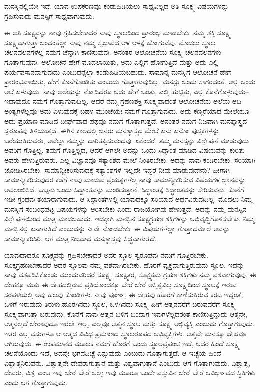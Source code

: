 ಮನಸ್ಸಿನಲ್ಲಿಯೇ ಇದೆ. ಯಾವ ಉಪಕರಣವೂ ಕಂಡುಹಿಡಿಯಲು ಸಾಧ್ಯವಿಲ್ಲದ ಅತಿ ಸೂಕ್ಷ್ಮ ವಿಷಯಗಳನ್ನು ಗ್ರಹಿಸುವುದು ಮನಸ್ಸಿಗೆ ಸಾಧ್ಯವಾಗುವುದು.

ಈ ಅತಿ ಸೂಕ್ಷ್ಮವನ್ನು ನಾವು ಗ್ರಹಿಸಬೇಕಾದರೆ ನಾವು ಸ್ಥೂಲದಿಂದ ಪ್ರಾರಂಭ ಮಾಡಬೇಕು. ನಮ್ಮ ಶಕ್ತಿ ಸೂಕ್ಷ್ಮ ಸೂಕ್ಷ್ಮವಾಗುತ್ತಾ ಬಂದಂತೆಲ್ಲಾ ನಾವು ನಮ್ಮ ಸ್ವಭಾವದ ಆಳ ಆಳಕ್ಕೆ ಹೋಗುವೆವು. ಮೊದಲು ಸ್ಥೂಲ ಚಲನವಲನಗಳೆಲ್ಲ ನಮಗೆ ಚೆನ್ನಾಗಿ ಕಾಣಿಸುವುವು. ಅನಂತರ ಆಲೋಚನೆಯ ಸೂಕ್ಷ್ಮ ಚಲನವಲನಗಳು ಗೊತ್ತಾಗುವುವು. ಆಲೋಚನೆ ಹೇಗೆ ಮೊದಲಾಯಿತು, ಅದು ಎಲ್ಲಿಗೆ ಹೋಗುತ್ತಿದೆ ಮತ್ತು ಅದು ಎಲ್ಲಿ ಪರ್ಯವಸಾನವಾಗುವುದು ಎಂಬುದನ್ನೆಲ್ಲಾ ಕಂಡುಹಿಡಿಯಬಹುದು. ಸಾಮಾನ್ಯ ಮನಸ್ಸಿಗೆ ಆಲೋಚನೆ ಹೇಗೆ ಪ್ರಾರಂಭವಾಯಿತು, ಹೇಗೆ ಕೊನೆಗೊಂಡಿತು ಎಂಬುದು ಗೊತ್ತಾಗುವುದಿಲ್ಲ. ಮನಸ್ಸು ಒಂದು ಸಾಗರದಂತೆ. ಅಲ್ಲಿ ಒಂದು ಅಲೆ ಏಳುವುದು. ನಾವು ಅಲೆಯನ್ನು ನೋಡಿದರೂ ಅದು ಹೇಗೆ ಬಂತು, ಎಲ್ಲಿ ಹುಟ್ಟಿತು, ಎಲ್ಲಿ ಕೊನೆಗೊಳ್ಳುವುದು–ಇದಾವುದೂ ನಮಗೆ ಗೊತ್ತಾಗುವುದಿಲ್ಲ. ಆದರೆ ನಮ್ಮ ಗ್ರಹಣಶಕ್ತಿ ಸೂಕ್ಷ್ಮವಾದಂತೆ ಆಲೋಚನೆಯ ಅಲೆಯ ಆದಿ ಅಂತ್ಯಗಳೆಲ್ಲವೂ ಅದು ಏಳುವುದಕ್ಕೆ ಬಹಳ ಮುಂಚೆಯೇ ನಮಗೆ ಗೊತ್ತಾಗುವುದು. ಅದು ಕಣ್ಮರೆಯಾದ ಮೇಲೆಯೂ ಅದು ಪ್ರಯಾಣ ಮಾಡಿದ ದೀರ್ಘವಾದ ಪಥವೂ ನಮಗೆ ಗೊತ್ತಾಗುತ್ತದೆ. ಅನಂತರ ನಮಗೆ ನಿಜವಾಗಿ ಮನಶ್ಶಾಸ್ತ್ರದ ಸ್ವರೂಪವು ತಿಳಿಯುತ್ತದೆ. ಈಗಿನ ಕಾಲದಲ್ಲಿ ಜನರು ಮನಶ್ಶಾಸ್ತ್ರದ ಮೇಲೆ ಏನು ಏನೋ ಪುಸ್ತಕಗಳನ್ನು ಬರೆಯುತ್ತಿರುವರು, ಅವೆಲ್ಲಾ ನಮ್ಮನ್ನು ದಾರಿತಪ್ಪಿಸುವಂಥವು. ಏಕೆಂದರೆ, ತಮ್ಮ ಮನಸ್ಸನ್ನು ವಿಶ್ಲೇಷಣೆ ಮಾಡುವುದು ಅವರಿಗೆ ಗೊತ್ತಿಲ್ಲ. ತಮಗೆ ಗೊತ್ತಿಲ್ಲದ, ಆದರೆ ಆಗಲೇ ಅದನ್ನು ಒಂದು ಸಿದ್ಧಾಂತ ಮಾಡಿದ ವಿಷಯವನ್ನು ಕುರಿತು ಅವರು ಹೇಳುತ್ತಿರುವರು. ಎಲ್ಲ ವಿಜ್ಞಾನವೂ ಸತ್ಯಾಂಶದ ಮೇಲೆ ನಿಂತಿರಬೇಕು. ಅದನ್ನು ನಾವು ಕಂಡಿರಬೇಕು; ಸರಿಯಾಗಿ ಜೋಡಿಸಿರಬೇಕು. ಸಾಮಾನ್ಯೀಕರಿಸುವುದಕ್ಕೆ ಸತ್ಯಾಂಶಗಳೆ ಇಲ್ಲದೇ ಇದ್ದರೆ ನೀವು ಮಾಡುವುದೇನು? ಹೀಗಾಗಿ ಸಾಮಾನ್ಯೀಕರಿಸುವುದರ ಕಡೆಗೆ ನಾವು ಮಾಡುವ ಪ್ರಯತ್ನಗಳೆಲ್ಲ ನಾವು ಸಾಮಾನ್ಯೀಕರಿಸುವ ವಿಷಯಗಳ ಜ್ಞಾನವನ್ನು ಅವಲಂಬಿಸಿದೆ. ಒಬ್ಬನು ಒಂದು ಸಿದ್ಧಾಂತವನ್ನು ಮಂಡಿಸುತ್ತಾನೆ. ಸಿದ್ಧಾಂತಕ್ಕೆ ಸಿದ್ಧಾಂತವನ್ನು ಸೇರಿಸುವನು. ಕೊನೆಗೆ ಇಡೀ ಗ್ರಂಥವು ತಯಾರಾಗುವುದು. ಆ ಸಿದ್ಧಾಂತಗಳಲ್ಲಿ ಯಾವುದಕ್ಕೂ ಸರಿಯಾದ ಅರ್ಥವಿರುವುದಿಲ್ಲ. ಮೊದಲು ನಿಮ್ಮ ಮನಸ್ಸಿಗೆ ಸಂಬಂಧಪಟ್ಟ ವಿಷಯಗಳನ್ನು ಆರಿಸಬೇಕು ಎಂದು ರಾಜಯೋಗವು ಹೇಳುತ್ತದೆ. ಅದನ್ನು ನಮ್ಮ ಮನಸ್ಸಿನ ವಿಶ್ಲೇಷಣೆಯಿಂದ ಮಾತ್ರ ಮಾಡಬಹುದು. ಇದಕ್ಕಾಗಿ ಮನಸ್ಸಿನ ಸೂಕ್ಷ್ಮಗ್ರಹಣ ಶಕ್ತಿಗಳನ್ನು ಅಭಿವೃದ್ಧಿಗೊಳಿಸಬೇಕು. ನಿಮ್ಮ ಮನಸ್ಸಿನಲ್ಲಿ ಏನಾಗುತ್ತಿದೆ ಎಂಬುದನ್ನು ನೀವೇ ನೋಡಬೇಕು. ಈ ವಿಷಯಗಳೆಲ್ಲಾ ಗೊತ್ತಾದಮೇಲೆ ಅವನ್ನು ಸಾಮಾನ್ಯೀಕರಿಸಿರಿ. ಆಗ ಮಾತ್ರ ನಿಜವಾದ ಮನಶ್ಶಾಸ್ತ್ರವು ಸಿದ್ಧವಾಗುತ್ತದೆ.

ಯಾವುದಾದರೂ ಸೂಕ್ಷ್ಮವನ್ನು ಗ್ರಹಿಸಬೇಕಾದರೆ ಅದರ ಸ್ಥೂಲ ಸ್ವರೂಪವು ನಮಗೆ ಗೊತ್ತಿರಬೇಕು. ಸೂಕ್ಷ್ಮಗ್ರಹಣಬೇಕಾದರೆ ಅದರ ಸ್ಥೂಲವು ನಮ್ಮ ವಶವಾಗಿರಬೇಕು. ಹೊರಗೆ ವ್ಯಕ್ತವಾಗುತ್ತಿರುವುದು ಸ್ಥೂಲ. ಇದನ್ನು ನಾವು ವಶಪಡಿಸಿಕೊಂಡು ಮುಂದುವರಿದರೆ ಸೂಕ್ಷ್ಮ, ಸೂಕ್ಷ್ಮತರ, ಸೂಕ್ಷ್ಮತಮ ಗ್ರಹಣ ಶಕ್ತಿಗಳು ನಮ್ಮ ವಶವಾಗುವುವು. ಈ ದೇಹಕ್ಕೂ ಮತ್ತು ಈ ದೇಹದಲ್ಲಿರುವ ಪ್ರತಿಯೊಂದಕ್ಕೂ ಬೇರೆ ಬೇರೆ ಅಸ್ತಿತ್ವವಿಲ್ಲ.\break ಸೂಕ್ಷ್ಮದಿಂದ ಸ್ಥೂಲಕ್ಕೆ ಇರುವ ಸರಪಳಿಯಲ್ಲಿ ಅವು ಹಲವು ಕೊಂಡಿಗಳು. ನೀವು ಪೂರ್ಣ, ಈ ದೇಹವು ಹೊರಗೆ ಕಾಣಿಸುತ್ತಿರುವ ಕರಟ ಇದ್ದಂತೆ, ಒಳಗೆ ಇರುವುದು ತಿರುಳು.\break ಹೊರಗಿನದು ಸ್ಥೂಲ, ಒಳಗಿನದು ಸೂಕ್ಷ್ಮ ಹೀಗೆ ಆತ್ಮನವರೆಗೆ ಬರುವವರೆಗೆ ಸೂಕ್ಷ್ಮ ಸೂಕ್ಷ್ಮವಾಗುತ್ತಾ ಬರುವುದು. ಕೊನೆಗೆ ನಾವು ಆತ್ಮನ ಬಳಿಗೆ ಬಂದಾಗ ಇವುಗಳೆಲ್ಲದರಂತೆ ಕಾಣಿಸುತ್ತಿದ್ದುದು ಆತ್ಮನೇ, ಆತ್ಮನಲ್ಲದೆ ಬೇರಾವುದೂ ಇರಲೇ ಇಲ್ಲ, ಎಲ್ಲವೂ ಆತ್ಮನ ಸ್ಥೂಲ ಮತ್ತು ಸೂಕ್ಷ್ಮ ಅಭಿವ್ಯಕ್ತಿ ಎಂಬುದು ಗೊತ್ತಾಗುವುದು. ಇತರ ಎಲ್ಲ ವಸ್ತುಗಳೂ ಆ ಆತ್ಮದ ವಿವಿಧ ಪ್ರಮಾಣದ ಸ್ಥೂಲರೂಪದ ಅಭಿವ್ಯಕ್ತಿಗಳು. ಆತ್ಮವೇ ಮನಸ್ಸೂ ದೇಹವೂ ಆಗಿರುವುದು. ಈ ಉಪಮಾನದ ಮೂಲಕ ನಮಗೆ ಹೊರಗೆ ಒಂದು ಸ್ಥೂಲಪ್ರಪಂಚ ಇದೆ, ಅದರ ಹಿಂದೆ ಸೂಕ್ಷ್ಮ ಚಲನೆಯೊಂದು ಇದೆ, ಅದನ್ನೇ ಭಗವದಿಚ್ಛೆ ಎನ್ನುವುದು ಎಂಬುದು ಗೊತ್ತಾಗುತ್ತದೆ. ಆ ಇಚ್ಛೆಯ ಹಿಂದೆ ವಿಶ್ವಾತ್ಮನಿರುವನು. ವಿಶ್ವಾತ್ಮನೇ ದೇವರಾಗುತ್ತಾನೆ ಮತ್ತು ವಿಶ್ವವಾಗುತ್ತಾನೆ ಎಂಬುದು ಆಗ ಗೊತ್ತಾಗುವುದು. ವಿಶ್ವಾತ್ಮ, ದೇವರು, ವಿಶ್ವ ಎಂಬ ಇವು ಬೇರೆ ಬೇರೆ ಅಲ್ಲ; ಇವು ಮೂರೂ ಒಂದೇ ವಸ್ತುವಿನ ಬೇರೆ ಬೇರೆ ಆವಿರ್ಭಾವದ ಸ್ಥಿತಿಗಳು ಎಂದು ಆಗ ಗೊತ್ತಾಗುವುದು.

